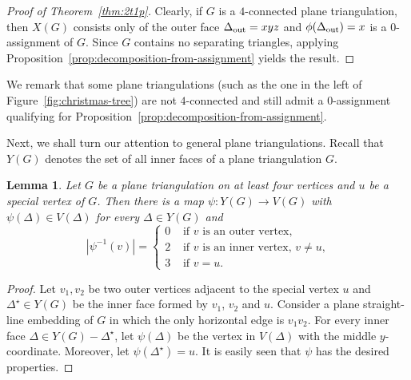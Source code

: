 \documentclass[a4paper,10pt]{article}
\theoremstyle{plain}
\newtheorem{lem}[thm]{Lemma}
\begin{document}
\begin{proof}[Proof of Theorem~\ref{thm:2t1p}]
 Clearly, if $G$ is a $4$-connected plane triangulation, then $X(G)$ consists only of the outer face $\Delta_{\rm out}=xyz$ and $\phi(\Delta_{\rm out}) = x$ is a $0$-assignment of $G$.
 Since $G$ contains no separating triangles, applying Proposition~\ref{prop:decomposition-from-assignment} yields the result.
\end{proof}

We remark that some plane triangulations (such as the one in the left of Figure~\ref{fig:christmas-tree}) are not $4$-connected and still admit a $0$-assignment qualifying for Proposition~\ref{prop:decomposition-from-assignment}.

Next, we shall turn our attention to general plane triangulations.
Recall that $Y(G)$ denotes the set of all inner faces of a plane triangulation $G$.

\begin{lem}\label{lem:inner-face-assignment}
 Let $G$ be a plane triangulation on at least four vertices and $u$ be a special vertex of $G$.
 Then there is a map $\psi : Y(G) \to V(G)$ with $\psi(\Delta) \in V(\Delta)$ for every $\Delta \in Y(G)$ and
 \[
  |\psi^{-1}(v)| = 
   \begin{cases}
    0 & \text{ if $v$ is an outer vertex,}\\
    2 & \text{ if $v$ is an inner vertex, $v \neq u$,}\\
    3 & \text{ if $v = u$.}
   \end{cases}
 \]
\end{lem}
% 
\begin{proof}
 Let $v_1,v_2$ be two outer vertices adjacent to the special vertex $u$ and $\Delta^\star \in Y(G)$ be the inner face formed by $v_1$, $v_2$ and $u$.
 Consider a plane straight-line embedding of $G$ in which the only horizontal edge is $v_1v_2$.
 For every inner face $\Delta \in Y(G) - \Delta^\star$, let $\psi(\Delta)$ be the vertex in $V(\Delta)$ with the middle $y$-coordinate.
 Moreover, let $\psi(\Delta^\star) = u$.
 It is easily seen that $\psi$ has the desired properties.
\end{proof}
\end{document}
